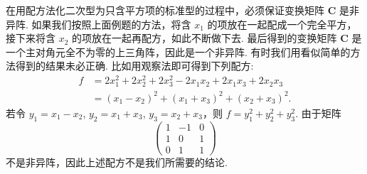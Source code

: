 \documentclass[../../main.tex]{subfiles}%
\begin{document}
\begin{remark}
在用配方法化二次型为只含平方项的标准型的过程中，必须保证变换矩阵 $\boldsymbol{C}$ 是非异阵. 如果我们按照上面例题的方法，将含 $x_1$ 的项放在一起配成一个完全平方，接下来将含 $x_2$ 的项放在一起再配方，如此不断做下去. 最后得到的变换矩阵 $\boldsymbol{C}$ 是一个主对角元全不为零的上三角阵，因此是一个非异阵. 有时我们用看似简单的方法得到的结果未必正确. 比如用观察法即可得到下列配方:
\begin{align*}
f&=2x_1^2 + 2x_2^2 + 2x_3^2 - 2x_1x_2 + 2x_1x_3 + 2x_2x_3\\
&=(x_1 - x_2)^2 + (x_1 + x_3)^2 + (x_2 + x_3)^2.
\end{align*}
若令 $y_1 = x_1 - x_2$, $y_2 = x_1 + x_3$, $y_3 = x_2 + x_3$，则 $f = y_1^2 + y_2^2 + y_3^2$. 由于矩阵
\[
\begin{pmatrix}
1 & -1 & 0\\
1 & 0 & 1\\
0 & 1 & 1
\end{pmatrix}
\]
不是非异阵，因此上述配方不是我们所需要的结论.
\end{remark}

\vspace{1cm}
\end{document}

